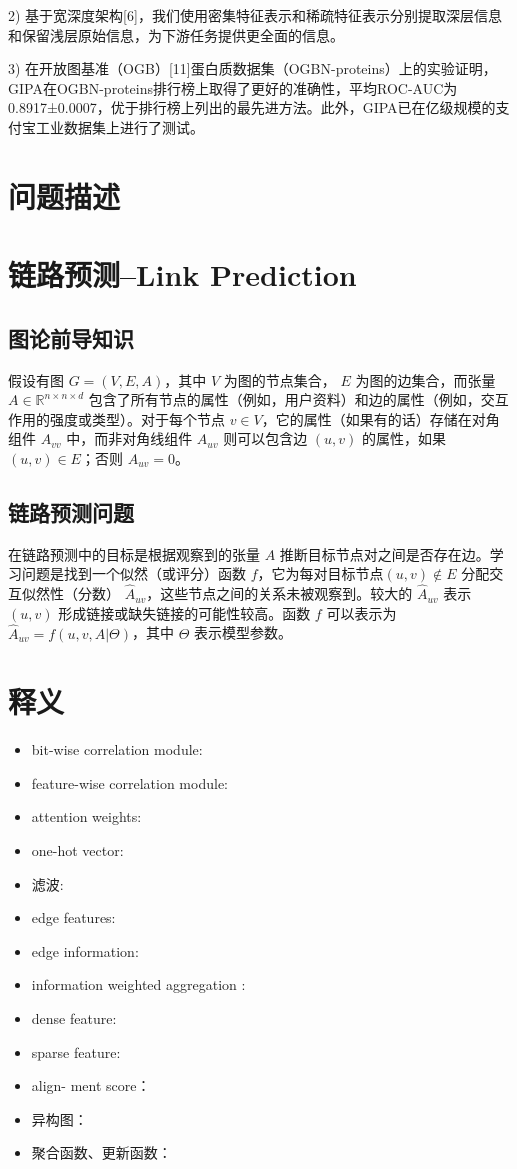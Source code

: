 \documentclass{article}
\begin{document}
2) 基于宽深度架构[6]，我们使用密集特征表示和稀疏特征表示分别提取深层信息和保留浅层原始信息，为下游任务提供更全面的信息。

3) 在开放图基准（OGB）[11]蛋白质数据集（OGBN-proteins）上的实验证明，GIPA在OGBN-proteins排行榜上取得了更好的准确性，平均ROC-AUC为0.8917±0.0007，优于排行榜上列出的最先进方法。此外，GIPA已在亿级规模的支付宝工业数据集上进行了测试。
\section*{问题描述}


\section*{链路预测--Link Prediction}
\subsection*{图论前导知识}
假设有图 $G = (V, E, A)$，其中 $V$ 为图的节点集合，
$E$ 为图的边集合，而张量 $A \in \mathbb{R}^{n \times n \times d}$ 
包含了所有节点的属性（例如，用户资料）和边的属性（例如，交互作用的强度或类型）。对于每个节点 $v \in V$，它的属性（如果有的话）存储在对角组件 $A_{vv}$ 中，而非对角线组件 $A_{uv}$ 则可以包含边 $(u, v)$ 的属性，如果 $(u, v) \in E$；否则 $A_{uv} = 0$。
\subsection*{链路预测问题}
在链路预测中的目标是根据观察到的张量 $A$ 推断目标节点对之间是否存在边。学习问题是找到一个似然（或评分）函数 $f$，它为每对目标节点$(u, v) \notin E$ 分配交互似然性（分数） $\hat{A}_{uv}$，这些节点之间的关系未被观察到。较大的 $\hat{A}_{uv}$ 表示 $(u, v)$ 形成链接或缺失链接的可能性较高。函数 $f$ 可以表示为 $\hat{A}_{uv} = f(u, v, A|\Theta)$，其中 $\Theta$ 表示模型参数。
\section*{释义}
\begin{itemize}
    \item  bit-wise correlation module:
    \item feature-wise correlation module:
    \item attention weights:
    \item  one-hot vector:
    \item   滤波:
    \item edge features:
    \item edge information:
    \item information weighted aggregation :
    \item dense feature:
    \item  sparse feature:
    \item align- ment score：
    \item 异构图：
    \item 聚合函数、更新函数：
\end{itemize}
\end{document}
